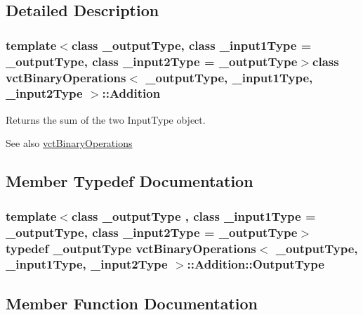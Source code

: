 \subsection{Detailed Description}
\subsubsection*{template$<$class \+\_\+output\+Type, class \+\_\+input1\+Type = \+\_\+output\+Type, class \+\_\+input2\+Type = \+\_\+output\+Type$>$class vct\+Binary\+Operations$<$ \+\_\+output\+Type, \+\_\+input1\+Type, \+\_\+input2\+Type $>$\+::\+Addition}

Returns the sum of the two Input\+Type object. 

\begin{DoxySeeAlso}{See also}
\hyperlink{classvct_binary_operations}{vct\+Binary\+Operations} 
\end{DoxySeeAlso}


\subsection{Member Typedef Documentation}
\hypertarget{classvct_binary_operations_1_1_addition_a2de5d1a14345e7ff12fe79a822941a39}{}
\subsubsection[{Output\+Type}]{\setlength{\rightskip}{0pt plus 5cm}template$<$class \+\_\+output\+Type , class \+\_\+input1\+Type  = \+\_\+output\+Type, class \+\_\+input2\+Type  = \+\_\+output\+Type$>$ typedef \+\_\+output\+Type {\bf vct\+Binary\+Operations}$<$ \+\_\+output\+Type, \+\_\+input1\+Type, \+\_\+input2\+Type $>$\+::{\bf Addition\+::\+Output\+Type}}\label{classvct_binary_operations_1_1_addition_a2de5d1a14345e7ff12fe79a822941a39}


\subsection{Member Function Documentation}
\hypertarget{classvct_binary_operations_1_1_addition_a8528b955a8c147436cb96cca50a5b73f}{}
